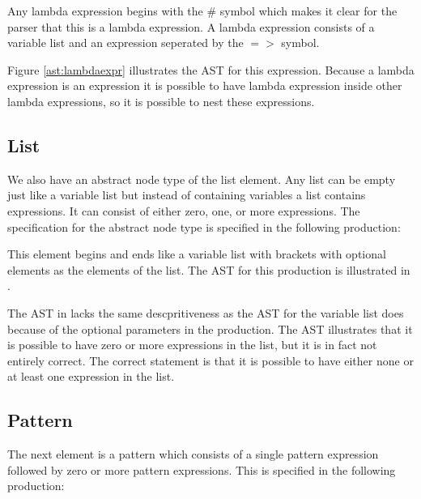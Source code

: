 Any lambda expression begins with the \# symbol which makes it clear for the parser that this is a lambda expression. A lambda expression consists of a variable list and an expression seperated by the $=>$ symbol.%

%

Figure \ref{ast:lambdaexpr} illustrates the AST for this expression. Because a lambda expression is an expression it is possible to have lambda expression inside other lambda expressions, so it is possible to nest these expressions.%

\subsection{List}%

We also have an abstract node type of the list element. Any list can be empty just like a variable list but instead of containing variables a list contains expressions. It can consist of either zero, one, or more expressions. The specification for the abstract node type is specified in the following production:%

\begin{ebnf}%
%
\end{ebnf}%

This element begins and ends like a variable list with brackets with optional elements as the elements of the list. The AST for this production is illustrated in .%

%

The AST in  lacks the same descpritiveness as the AST for the variable list does because of the optional parameters in the production. The AST illustrates that it is possible to have zero or more expressions in the list, but it is in fact not entirely correct. The correct statement is that it is possible to have either none or at least one expression in the list.%

\subsection{Pattern}%

The next element is a pattern which consists of a single pattern expression followed by zero or more pattern expressions. This is specified in the following production:%

